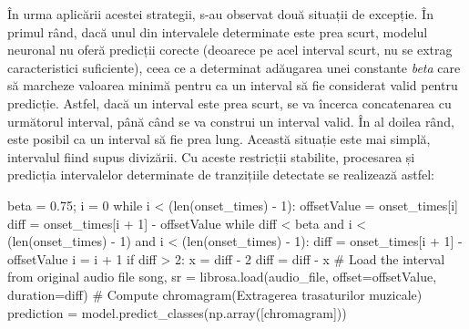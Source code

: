 \documentclass[a4paper,12pt]{report}
\begin{document}
În urma aplicării acestei strategii, s-au 
observat două situații de excepție. În primul rând, dacă unul din intervalele 
determinate este prea scurt, modelul neuronal nu oferă predicții corecte 
(deoarece pe acel interval scurt, nu se extrag caracteristici suficiente), ceea ce 
a determinat adăugarea unei constante \emph{beta} care să marcheze valoarea minimă 
pentru ca un interval să fie considerat valid pentru predicție. Astfel, dacă un interval 
este prea scurt, se va încerca concatenarea cu următorul interval, până când se va construi 
un interval valid. În al doilea rând, este posibil ca un interval să fie prea lung. 
Această situație este mai simplă, intervalul fiind supus divizării. Cu aceste restricții
stabilite, procesarea și predicția intervalelor determinate de tranzițiile 
detectate se realizează astfel:

\begin{python}
beta = 0.75; i = 0
while i < (len(onset_times) - 1):
    offsetValue = onset_times[i]
    diff = onset_times[i + 1] - offsetValue
    while diff < beta and i < (len(onset_times) - 1) 
        and i < (len(onset_times) - 1):
            diff = onset_times[i + 1] - offsetValue
            i = i + 1
    if diff > 2:
        x = diff - 2
        diff = diff - x
    # Load the interval from original audio file
    song, sr = librosa.load(audio_file,
                            offset=offsetValue, 
                            duration=diff)
    # Compute chromagram(Extragerea trasaturilor muzicale)
    prediction = model.predict_classes(np.array([chromagram]))
\end{python}

\end{document}
